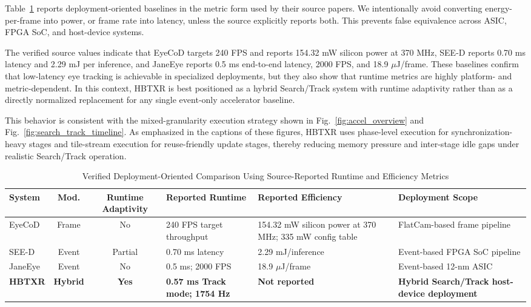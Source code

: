 ﻿\documentclass[journal]{IEEEtran}
\begin{document}
Table~\ref{tab:compare_deploy} reports deployment-oriented baselines in the metric form used by their source papers. We intentionally avoid converting energy-per-frame into power, or frame rate into latency, unless the source explicitly reports both. This prevents false equivalence across ASIC, FPGA SoC, and host-device systems.

The verified source values indicate that EyeCoD targets 240 FPS and reports 154.32 mW silicon power at 370 MHz, SEE-D reports 0.70 ms latency and 2.29 mJ per inference, and JaneEye reports 0.5 ms end-to-end latency, 2000 FPS, and 18.9 $\mu$J/frame. These baselines confirm that low-latency eye tracking is achievable in specialized deployments, but they also show that runtime metrics are highly platform- and metric-dependent. In this context, HBTXR is best positioned as a hybrid Search/Track system with runtime adaptivity rather than as a directly normalized replacement for any single event-only accelerator baseline.

This behavior is consistent with the mixed-granularity execution strategy shown in Fig.~\ref{fig:accel_overview} and Fig.~\ref{fig:search_track_timeline}. As emphasized in the captions of these figures, HBTXR uses phase-level execution for synchronization-heavy stages and tile-stream execution for reuse-friendly update stages, thereby reducing memory pressure and inter-stage idle gaps under realistic Search/Track operation.

\begin{table}[!t]
\caption{Verified Deployment-Oriented Comparison Using Source-Reported Runtime and Efficiency Metrics}
\label{tab:compare_deploy}
\centering
\scriptsize
\begin{tabular}{l c c p{2.8cm} p{2.8cm} p{4.0cm}}
\toprule
System & Mod. & Runtime Adaptivity & Reported Runtime & Reported Efficiency & Deployment Scope \\
\midrule
EyeCoD & Frame & No & 240 FPS target throughput & 154.32 mW silicon power at 370 MHz; 335 mW config table & FlatCam-based frame pipeline \\
SEE-D & Event & Partial & 0.70 ms latency & 2.29 mJ/inference & Event-based FPGA SoC pipeline \\
JaneEye & Event & No & 0.5 ms; 2000 FPS & 18.9 $\mu$J/frame & Event-based 12-nm ASIC \\
\textbf{HBTXR} & \textbf{Hybrid} & \textbf{Yes} & \textbf{0.57 ms Track mode; 1754 Hz} & \textbf{Not reported} & \textbf{Hybrid Search/Track host-device deployment} \\
\bottomrule
\end{tabular}
\end{table}
\end{document}

